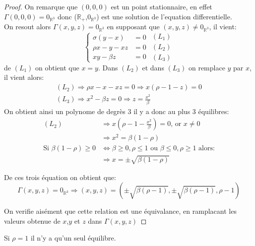 \documentclass{article}
\newcommand{\R}{\mathbb{R}}
\newtheorem[M , nocut]{prop}{Proposition}[section]
\newtheorem[M]{propt}{Propriété}[section]
\newtheorem[L , nocut]{thm}{Théoreme}
\newtheorem[L]{cor}{Corollaire}
\begin{document}
\begin{proof}
On remarque que $(0,0,0)$ est un point stationnaire, en effet $\Gamma(0,0,0) = 0_{\R^3}$ donc ($\R_+$,$0_{\R^3}$) est une solution de l'equation differentielle.\\
On resout alors $\Gamma(x,y,z)=0_{\R^3}$ en supposant que $(x,y,z) \neq 0_{\R^3}$, il vient:
\[
\left\{\begin{array}{rl} %
     \sigma(y-x)&=0  \\
     \rho x -y -xz&=0\\
     xy - \beta z&=0
\end{array}\right.
\begin{array}{c} %
    (L_1)\\
    (L_2)\\
    (L_3)
\end{array}
\]
de $(L_1)$ on obtient que $x=y$. Dans $(L_2)$ et dans $(L_3)$ on remplace $y$ par $x$, il vient alors:
\begin{gather*}
    (L_2) \Rightarrow \rho x - x - xz = 0 \Rightarrow x (\rho -1 -z ) = 0 \\
    (L_3) \Rightarrow x^2 - \beta z = 0 \Rightarrow z = \frac{x^2}{\beta}
\end{gather*}
On obtient ainsi un polynome de degrès 3 il y a donc au plus 3 équilibres:
\begin{align*}
    (L_2) & \Rightarrow x (\rho - 1 - \frac{x^2}{\beta}) = 0 \text{, or }x \neq 0\\
        & \Rightarrow x^2 = \beta (1-\rho)\\
    \text{Si } \beta(1-\rho) \ge 0 & \Leftrightarrow \beta \ge 0,\rho\le 1 \text{ ou } \beta \le 0,\rho\ge 1\text{ alors:}\\
    &\Rightarrow x = \pm \sqrt{\beta(1-\rho)}
\end{align*}

De ces trois équation on obtient que:
\[
    \Gamma(x,y,z)=0_{\R^3} \Rightarrow (x,y,z) = (\pm \sqrt{ \beta (\rho -1)} ,\pm \sqrt{\beta (\rho -1)}, \rho -1)
\]

On verifie aisément que cette relation est une \'equivalance, en ramplacant les valeurs obtenue de $x$,$y$ et $z$ dans $\Gamma(x,y,z)$
\end{proof}

\begin{example}[Remarque]
    Si $\rho=1$ il n'y a qu'un seul équilibre.
\end{example}
\end{document}
